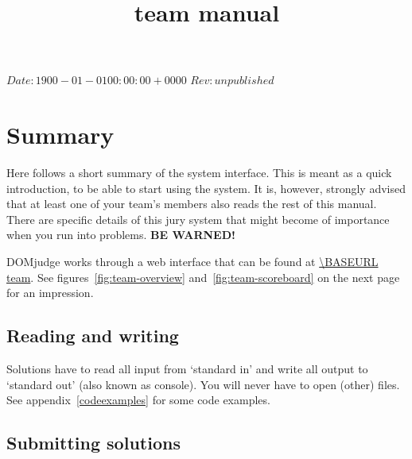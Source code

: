 

\usepackage[english]{babel}
\usepackage{minted}

\SVN $Date: 1900-01-01 00:00:00 +0000 $
\SVN $Rev: unpublished $

\title{\DOMjudge team manual}




\titlestuff{\DOMJUDGEVERSION}{\SVNRev}{\SVNDate}{\today}

\section*{Summary}

Here follows a short summary of the system interface. This is meant as
a quick introduction, to be able to start using the system. It is,
however, strongly advised that at least one of your team's members
also reads the rest of this manual. There are specific details of this
jury system that might become of importance when you run into
problems. \textbf{BE WARNED!}

DOMjudge works through a web interface that can be found at
\url{\BASEURL team}. See figures~\ref{fig:team-overview}
and~\ref{fig:team-scoreboard} on the next page for an impression.

\subsection*{Reading and writing}

Solutions have to read all input from `standard in' and write all
output to `standard out' (also known as console). You will never have
to open (other) files. See appendix~\ref{codeexamples} for some code
examples.

\subsection*{Submitting solutions}

